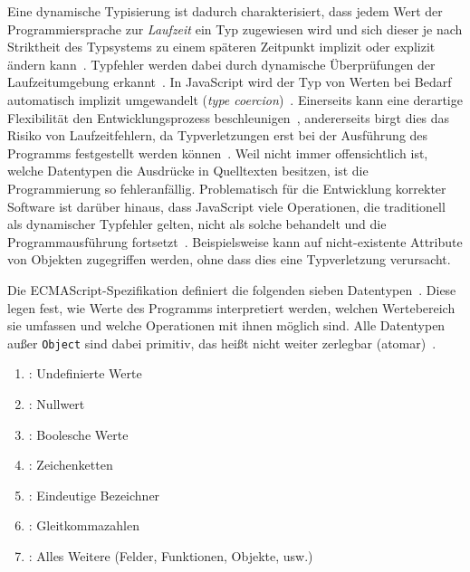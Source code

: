 Eine dynamische Typisierung ist dadurch charakterisiert, dass jedem Wert der Programmiersprache zur \emph{Laufzeit} ein Typ zugewiesen wird und sich dieser je nach Striktheit des Typsystems zu einem späteren Zeitpunkt implizit oder explizit ändern kann~\autocite[45]{WALDMANN:PPS}. Typfehler werden dabei durch dynamische Überprüfungen der Laufzeitumgebung erkannt~\autocite[37]{CARDELLI:TYPE_SYSTEMS}. In JavaScript wird der Typ von Werten bei Bedarf automatisch implizit umgewandelt (\emph{type coercion})~\autocite{RICHARDS:2010}. Einerseits kann eine derartige Flexibilität den Entwicklungsprozess beschleunigen~\autocite[1]{FLOW:PAPER}, andererseits birgt dies das Risiko von Laufzeitfehlern, da Typverletzungen erst bei der Ausführung des Programms festgestellt werden können~\autocite{ANDERSON:2005}. Weil nicht immer offensichtlich ist, welche Datentypen die Ausdrücke in Quelltexten besitzen, ist die Programmierung so fehleranfällig. Problematisch für die Entwicklung korrekter Software ist darüber hinaus, dass JavaScript viele Operationen, die traditionell als dynamischer Typfehler gelten, nicht als solche behandelt und die Programmausführung fortsetzt~\autocite{NIKHIL:2014}. Beispielsweise kann auf nicht-existente Attribute von Objekten zugegriffen werden, ohne dass dies eine Typverletzung verursacht.

Die ECMAScript-Spezifikation definiert die folgenden sieben Datentypen~\autocite[25]{ECMASCRIPT:2019}. Diese legen fest, wie Werte des Programms interpretiert werden, welchen Wertebereich sie umfassen und welche Operationen mit ihnen möglich sind. Alle Datentypen außer \texttt{Object} sind dabei primitiv, das heißt nicht weiter zerlegbar (atomar)~\autocite[8]{ECMASCRIPT:2019}.

\begin{enumerate}
  \item {}: Undefinierte Werte
  \item {}: Nullwert
  \item {}: Boolesche Werte
  \item {}: Zeichenketten
  \item {}: Eindeutige Bezeichner
  \item {}: Gleitkommazahlen
  \item {}: Alles Weitere (Felder, Funktionen, Objekte, usw.)
\end{enumerate}


